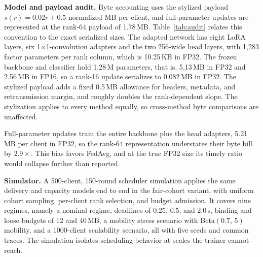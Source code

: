 \documentclass[preprint,12pt]{elsarticle}
\begin{document}
\begin{table}[H]
\centering
\caption{Payload audit of the actual serialized adapter-update size against the stylized payload model $s(r)$. The frozen backbone (1.28\,M parameters) is 5.13\,MB in FP32; factor shapes are listed in the reproducibility package.}
\label{tab:audit}
\end{table}

\textbf{Model and payload audit.} Byte accounting uses the stylized payload $s(r)=0.02r+0.5$ normalized MB per client, and full-parameter updates are represented at the rank-64 payload of 1.78\,MB. Table~\ref{tab:audit} relates this convention to the exact serialized sizes. The adapted network has eight LoRA layers, six 1$\times$1-convolution adapters and the two 256-wide head layers, with 1{,}283 factor parameters per rank column, which is 10.25\,KB in FP32. The frozen backbone and classifier hold 1.28\,M parameters, that is, 5.13\,MB in FP32 and 2.56\,MB in FP16, so a rank-16 update serializes to 0.082\,MB in FP32. The stylized payload adds a fixed 0.5\,MB allowance for headers, metadata, and retransmission margin, and roughly doubles the rank-dependent slope. The stylization applies to every method equally, so cross-method byte comparisons are unaffected.

Full-parameter updates train the entire backbone plus the head adapters, 5.21\,MB per client in FP32, so the rank-64 representation understates their byte bill by $2.9\times$. This bias favors FedAvg, and at the true FP32 size its timely ratio would collapse further than reported.

\textbf{Simulator.} A 500-client, 150-round scheduler simulation applies the same delivery and capacity models end to end in the fair-cohort variant, with uniform cohort sampling, per-client rank selection, and budget admission. It covers nine regimes, namely a nominal regime, deadlines of 0.25, 0.5, and 2.0\,s, binding and loose budgets of 12 and 40\,MB, a mobility stress scenario with Beta$(0.7,\,5)$ mobility, and a 1000-client scalability scenario, all with five seeds and common traces. The simulation isolates scheduling behavior at scales the trainer cannot reach.
\end{document}
